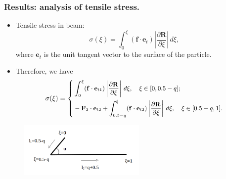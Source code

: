 \documentclass{beamer}
\begin{document}


\begin{frame}
	\frametitle{Results: analysis of tensile stress.}
	\begin{overlayarea}{\textwidth}{\textheight}
		\vspace{-0.3cm}
	\begin{itemize}
		\item \small Tensile stress in beam:
		\begin{equation*}
			\sigma(\xi)=\int_0^\xi (\mathbf{f}\cdot\mathbf{e}_t) \left |\frac{\partial \mathbf{R}}{\partial \xi}\right|\,d\xi,
		\end{equation*}
		where $\mathbf{e}_t$ is the unit tangent vector to the surface of the particle. 
	\item \small Therefore, we have 
	\begin{equation*}\small 
		\sigma(\xi)=\left\{
		\begin{aligned}
			\label{eq:4}
			&\int_0^\xi (\mathbf{f}\cdot\mathbf{e}_{t1}) \left |\frac{\partial \mathbf{R}}{\partial \xi}\right|\,d\xi,\quad \xi\in[0,0.5-q];\\
			&-\mathbf{F}_2\cdot\mathbf{e}_{t2}+\int_{0.5-q}^\xi (\mathbf{f}\cdot\mathbf{e}_{t2}) \left |\frac{\partial \mathbf{R}}{\partial \xi}\right|\,d\xi, \quad \xi\in[0.5-q,1].
		\end{aligned}\right.
	\end{equation*}
	\end{itemize}\vspace{-0.4cm}
	\begin{figure}[htb]
	\begin{center}
		\includegraphics[width=0.55\textwidth]{plots/tensile_boomerang.png}
	\end{center}
\end{figure}
	\end{overlayarea}
\end{frame}

\end{document}
